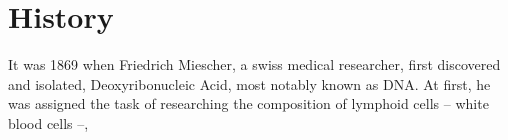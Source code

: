 \section{History}

It was 1869 when Friedrich Miescher, a swiss medical researcher, first discovered and isolated, Deoxyribonucleic Acid, most notably known as DNA. At first, he was assigned the task of researching the composition of lymphoid cells -- white blood cells --, 